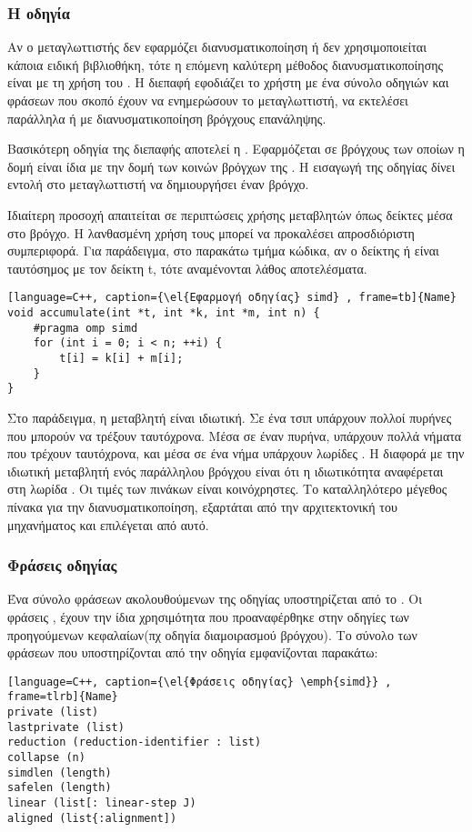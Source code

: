 \clearpage
\subsubsection{Η οδηγία \emph{}}
Αν ο μεταγλωττιστής δεν εφαρμόζει διανυσματικοποίηση ή δεν χρησιμοποιείται κάποια ειδική βιβλιοθήκη, τότε η επόμενη
καλύτερη μέθοδος διανυσματικοποίησης είναι με τη χρήση του \emph{}. Η διεπαφή εφοδιάζει το χρήστη με ένα
σύνολο οδηγιών και φράσεων που σκοπό έχουν να ενημερώσουν το μεταγλωττιστή, να εκτελέσει παράλληλα ή με
διανυσματικοποίηση βρόγχους επανάληψης.

Βασικότερη οδηγία της διεπαφής αποτελεί η \textbf{\emph{}}. Εφαρμόζεται σε βρόγχους των οποίων η δομή είναι
ίδια με την δομή των κοινών βρόγχων της \emph{}. Η εισαγωγή της οδηγίας \emph{} δίνει εντολή στο
μεταγλωττιστή να δημιουργήσει έναν \emph{} βρόγχο.

Ιδιαίτερη προσοχή απαιτείται σε περιπτώσεις χρήσης  μεταβλητών όπως δείκτες μέσα στο βρόγχο. Η λανθασμένη χρήση τους
μπορεί να προκαλέσει απροσδιόριστη συμπεριφορά. Για παράδειγμα, στο παρακάτω τμήμα κώδικα, αν ο δείκτης \emph{} ή
\emph{} είναι ταυτόσημος με τον δείκτη t, τότε αναμένονται λάθος αποτελέσματα. 

\begin{lstlisting}[language=C++, caption={\el{Εφαρμογή οδηγίας} simd} , frame=tb]{Name}
void accumulate(int *t, int *k, int *m, int n) {
	#pragma omp simd
	for (int i = 0; i < n; ++i) {
		t[i] = k[i] + m[i];
	}
}
\end{lstlisting}


Στο παράδειγμα, η μεταβλητή \emph{} είναι ιδιωτική.
Σε ένα τσιπ υπάρχουν πολλοί πυρήνες που μπορούν να τρέξουν ταυτόχρονα. Μέσα σε έναν πυρήνα, υπάρχουν πολλά νήματα που τρέχουν ταυτόχρονα, και μέσα σε ένα νήμα υπάρχουν λωρίδες .
Η διαφορά με την ιδιωτική μεταβλητή ενός παράλληλου βρόγχου
είναι ότι η ιδιωτικότητα αναφέρεται στη λωρίδα \emph{}. Οι τιμές των πινάκων \emph{} είναι
κοινόχρηστες. Το καταλληλότερο μέγεθος πίνακα για την διανυσματικοποίηση, εξαρτάται από την αρχιτεκτονική του
μηχανήματος και επιλέγεται από αυτό. 
\subsubsection{Φράσεις οδηγίας \emph{}}
Ένα σύνολο φράσεων ακολουθούμενων της οδηγίας \emph{} υποστηρίζεται από το \emph{}. Οι φράσεις
\emph{}, έχουν την ίδια χρησιμότητα που προαναφέρθηκε στην
οδηγίες των προηγούμενων κεφαλαίων(πχ οδηγία διαμοιρασμού βρόγχου). Το σύνολο των φράσεων που υποστηρίζονται από την
οδηγία εμφανίζονται παρακάτω:
\begin{lstlisting}[language=C++, caption={\el{Φράσεις οδηγίας} \emph{simd}} , frame=tlrb]{Name}
private (list)
lastprivate (list)
reduction (reduction-identifier : list)
collapse (n)
simdlen (length)
safelen (length)
linear (list[: linear-step J)
aligned (list{:alignment])
\end{lstlisting}

